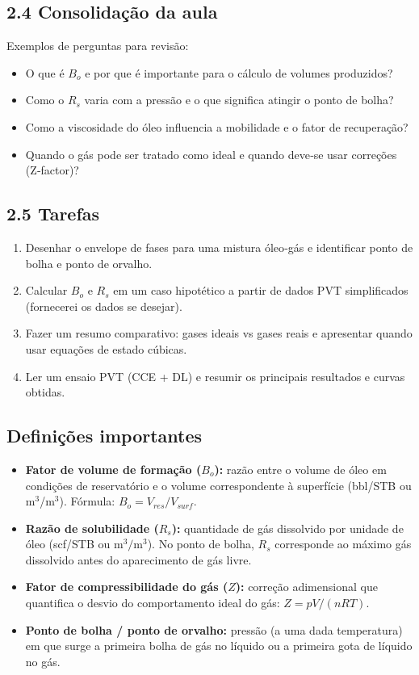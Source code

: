 \documentclass[11pt,a4paper]{article}
\begin{document}
\subsection{2.4 Consolidação da aula}
Exemplos de perguntas para revisão:
\begin{itemize}
\item O que é $B_o$ e por que é importante para o cálculo de volumes produzidos?
\item Como o $R_s$ varia com a pressão e o que significa atingir o ponto de bolha?
\item Como a viscosidade do óleo influencia a mobilidade e o fator de recuperação?
\item Quando o gás pode ser tratado como ideal e quando deve‑se usar correções (Z‑factor)?
\end{itemize}

\subsection{2.5 Tarefas}
\begin{enumerate}
\item Desenhar o envelope de fases para uma mistura óleo‑gás e identificar ponto de bolha e ponto de orvalho.
\item Calcular $B_o$ e $R_s$ em um caso hipotético a partir de dados PVT simplificados (fornecerei os dados se desejar).
\item Fazer um resumo comparativo: gases ideais vs gases reais e apresentar quando usar equações de estado cúbicas.
\item Ler um ensaio PVT (CCE + DL) e resumir os principais resultados e curvas obtidas.
\end{enumerate}

\subsection{Definições importantes}
\begin{itemize}
\item \textbf{Fator de volume de formação ($B_o$):} razão entre o volume de óleo em condições de reservatório e o volume correspondente à superfície (bbl/STB ou m$^3$/m$^3$). Fórmula: $B_o = V_{res}/V_{surf}$.
\item \textbf{Razão de solubilidade ($R_s$):} quantidade de gás dissolvido por unidade de óleo (scf/STB ou $\mathrm{m}^3/\mathrm{m}^3$). No ponto de bolha, $R_s$ corresponde ao máximo gás dissolvido antes do aparecimento de gás livre.
\item \textbf{Fator de compressibilidade do gás ($Z$):} correção adimensional que quantifica o desvio do comportamento ideal do gás: $Z = pV/(nRT)$.
\item \textbf{Ponto de bolha / ponto de orvalho:} pressão (a uma dada temperatura) em que surge a primeira bolha de gás no líquido ou a primeira gota de líquido no gás.
\end{itemize}
\end{document}
